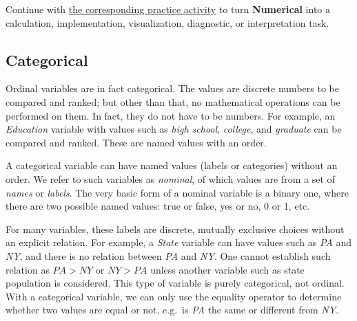 \documentclass[
  letterpaper,
]{scrbook}
\begin{document}
\begin{tcolorbox}[enhanced jigsaw, arc=.35mm, bottomrule=.15mm, bottomtitle=1mm, breakable, colback=white, colbacktitle=quarto-callout-tip-color!10!white, colframe=quarto-callout-tip-color-frame, coltitle=black, left=2mm, leftrule=.75mm, opacityback=0, opacitybacktitle=0.6, rightrule=.15mm, title=\textcolor{quarto-callout-tip-color}{\faLightbulb}\hspace{0.5em}{Put it into practice}, titlerule=0mm, toprule=.15mm, toptitle=1mm]

Continue with \hyperref[sec-pr-02-numerical]{the corresponding practice
activity} to turn \textbf{Numerical} into a calculation, implementation,
visualization, diagnostic, or interpretation task.

\end{tcolorbox}

\subsection{Categorical}\label{categorical}

Ordinal variables are in fact categorical. The values are discrete
numbers to be compared and ranked; but other than that, no mathematical
operations can be performed on them. In fact, they do not have to be
numbers. For example, an \emph{Education} variable with values such as
\emph{high school}, \emph{college}, and \emph{graduate} can be compared
and ranked. These are named values with an order.

A categorical variable can have named values (labels or categories)
without an order. We refer to such variables as \emph{nominal}, of which
values are from a set of \emph{names} or \emph{labels}. The very basic
form of a nominal variable is a binary one, where there are two possible
named values: true or false, yes or no, 0 or 1, etc.

For many variables, these labels are discrete, mutually exclusive
choices without an explicit relation. For example, a \emph{State}
variable can have values such as \emph{PA} and \emph{NY}, and there is
no relation between \emph{PA} and \emph{NY}. One cannot establish such
relation as \(PA>NY\) or \(NY>PA\) unless another variable such as state
population is considered. This type of variable is purely categorical,
not ordinal. With a categorical variable, we can only use the equality
operator to determine whether two values are equal or not, e.g.~is
\emph{PA} the same or different from \emph{NY}.
\end{document}
